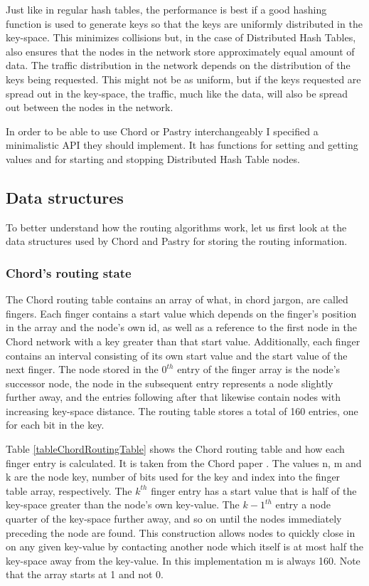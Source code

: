 Just like in regular hash tables, the performance is best if a good hashing function is used to generate keys so that the keys are uniformly distributed in the key-space. This minimizes collisions but, in the case of Distributed Hash Tables, also ensures that the nodes in the network store approximately equal amount of data. The traffic distribution in the network depends on the distribution of the keys being requested. This might not be as uniform, but if the keys requested are spread out in the key-space, the traffic, much like the data, will also be spread out between the nodes in the network.

In order to be able to use Chord or Pastry interchangeably I specified a minimalistic API they should implement. It has functions for setting and getting values and for starting and stopping Distributed Hash Table nodes.

\subsection{Data structures}
To better understand how the routing algorithms work, let us first look at the data structures used by Chord and Pastry for storing the routing information.

\subsubsection{Chord's routing state}
\label{sec:chordRoutingState}
The Chord routing table contains an array of what, in chord jargon, are called fingers.
Each finger contains a start value which depends on the finger's position in the array and the node's own id, as well as a reference to the first node in the Chord network with a key greater than that start value.
Additionally, each finger contains an interval consisting of its own start value and the start value of the next finger.
The node stored in the $ 0^{th} $ entry of the finger array is the node's successor node, the node in the subsequent entry represents a node slightly further away, and the entries following after that likewise contain nodes with increasing key-space distance.
The routing table stores a total of 160 entries, one for each bit in the key.

Table \ref{tableChordRoutingTable} shows the Chord routing table and how each finger entry is calculated. It is taken from the Chord paper \cite{chord}. The values n, m and k are the node key, number of bits used for the key and index into the finger table array, respectively. 
The $ k^{th} $ finger entry has a start value that is half of the key-space greater than the node's own key-value. The $ k-1^{th} $ entry a node quarter of the key-space further away, and so on until the nodes immediately preceding the node are found.
This construction allows nodes to quickly close in on any given key-value by contacting another node which itself is at most half the key-space away from the key-value.
In this implementation m is always 160. Note that the array starts at 1 and not 0.


